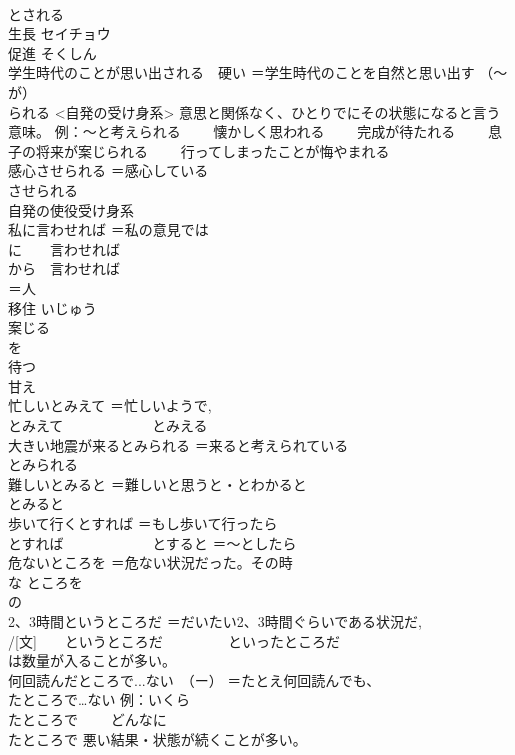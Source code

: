 \documentclass[8pt]{extreport}
\begin{document}
\begin{CJK}{UTF8}{min}
\\	とされる
\\	生長	セイチョウ 
\\	促進	そくしん 
\\	学生時代のことが思い出される　硬い	＝学生時代のことを自然と思い出す （〜が）
\\	られる <自発の受け身系> 意思と関係なく、ひとりでにその状態になると言う意味。 例：〜と考えられる 　　懐かしく思われる 　　完成が待たれる 　　息子の将来が案じられる 　　行ってしまったことが悔やまれる
\\	感心させられる	＝感心している 
\\	させられる　
\\	自発の使役受け身系
\\	私に言わせれば	＝私の意見では 
\\	に　　言わせれば 
\\	から　言わせれば 
\\	＝人
\\	移住	いじゅう 
\\	案じる	
\\	を
\\	待つ	
\\	甘え	
\\	忙しいとみえて	＝忙しいようで, 
\\	とみえて 　　　　　　とみえる
\\	大きい地震が来るとみられる	＝来ると考えられている 
\\	とみられる
\\	難しいとみると	＝難しいと思うと・とわかると 
\\	とみると
\\	歩いて行くとすれば	＝もし歩いて行ったら 
\\	とすれば 　　　　　　とすると ＝〜としたら
\\	危ないところを	＝危ない状況だった。その時 
\\	な ところを 
\\	の
\\	2、3時間というところだ	＝だいたい2、3時間ぐらいである状況だ, 
\\	/[文]　　というところだ 　　　　 といったところだ 
\\	は数量が入ることが多い。
\\	何回読んだところで...ない　（ー）	＝たとえ何回読んでも、
\\	たところで…ない 例：いくら
\\	たところで 　　どんなに
\\	たところで 悪い結果・状態が続くことが多い。

\end{CJK}
\end{document}
